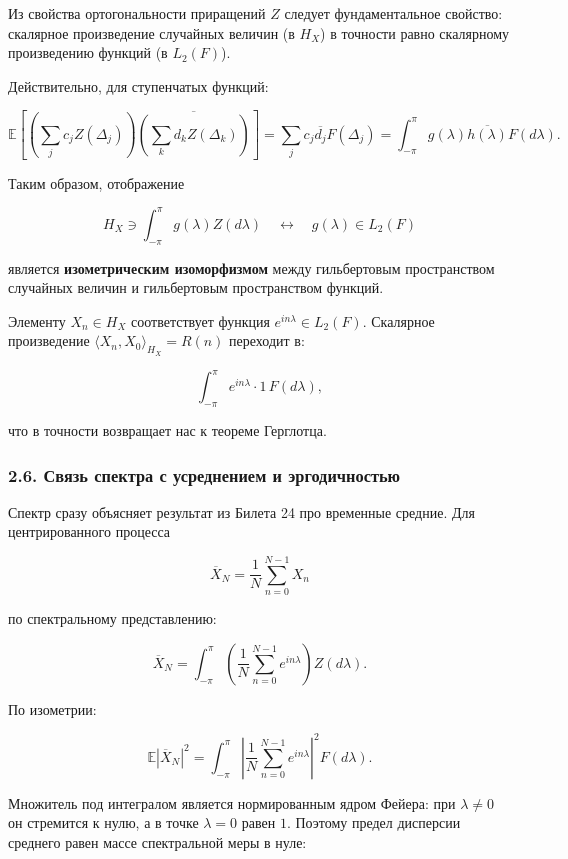 \documentclass[
  11pt,
  a4paper,
]{article}
\begin{document}
Из свойства ортогональности приращений \(Z\) следует фундаментальное
свойство: скалярное произведение случайных величин (в \(H_X\)) в
точности равно скалярному произведению функций (в \(L_2(F)\)).

Действительно, для ступенчатых функций:

\[
\mathbb E \left[ \left( \sum_j c_j Z(\Delta_j) \right) \overline{\left( \sum_k d_k Z(\Delta_k) \right)} \right]
=
\sum_j c_j \overline{d_j} F(\Delta_j)
=
\int_{-\pi}^{\pi} g(\lambda) \overline{h(\lambda)} F(d\lambda).
\]

Таким образом, отображение

\[
H_X \ni \int_{-\pi}^{\pi} g(\lambda) Z(d\lambda) \quad \longleftrightarrow \quad g(\lambda) \in L_2(F)
\]

является \textbf{изометрическим изоморфизмом} между гильбертовым
пространством случайных величин и гильбертовым пространством функций.

Элементу \(X_n \in H_X\) соответствует функция
\(e^{i n \lambda} \in L_2(F)\). Скалярное произведение
\(\langle X_n, X_0 \rangle_{H_X} = R(n)\) переходит в:

\[
\int_{-\pi}^{\pi} e^{i n \lambda} \cdot 1 \, F(d\lambda),
\]

что в точности возвращает нас к теореме Герглотца.

\subsubsection{2.6. Связь спектра с усреднением и
эргодичностью}\label{ux441ux432ux44fux437ux44c-ux441ux43fux435ux43aux442ux440ux430-ux441-ux443ux441ux440ux435ux434ux43dux435ux43dux438ux435ux43c-ux438-ux44dux440ux433ux43eux434ux438ux447ux43dux43eux441ux442ux44cux44e}

Спектр сразу объясняет результат из Билета 24 про временные средние. Для
центрированного процесса

\[
\overline X_N=\frac1N\sum_{n=0}^{N-1}X_n
\]

по спектральному представлению:

\[
\overline X_N
=
\int_{-\pi}^{\pi}
\left(\frac1N\sum_{n=0}^{N-1}e^{in\lambda}\right)
Z(d\lambda).
\]

По изометрии:

\[
\mathbb E|\overline X_N|^2
=
\int_{-\pi}^{\pi}
\left|
\frac1N\sum_{n=0}^{N-1}e^{in\lambda}
\right|^2
F(d\lambda).
\]

Множитель под интегралом является нормированным ядром Фейера: при
\(\lambda\ne0\) он стремится к нулю, а в точке \(\lambda=0\) равен
\(1\). Поэтому предел дисперсии среднего равен массе спектральной меры в
нуле:
\end{document}
